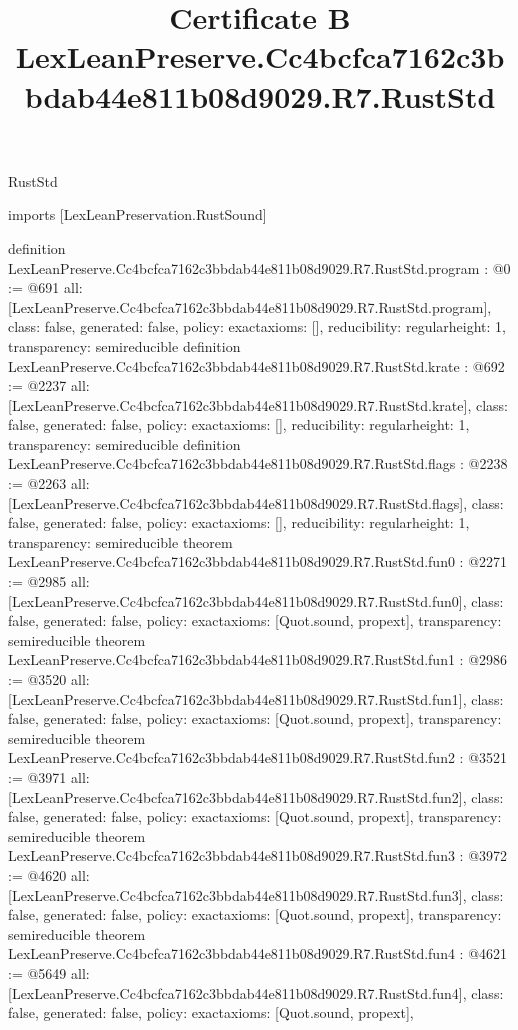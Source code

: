 \begin{lexlean}{RustStd}
\title{Certificate B LexLeanPreserve.Cc4bcfca7162c3bbdab44e811b08d9029.R7.RustStd}
\begin{coremodule}
imports [LexLeanPreservation.RustSound]

definition LexLeanPreserve.Cc4bcfca7162c3bbdab44e811b08d9029.R7.RustStd.program : @0 := @691 {
  all: [LexLeanPreserve.Cc4bcfca7162c3bbdab44e811b08d9029.R7.RustStd.program],
  class: false,
  generated: false,
  policy: exact{axioms: []},
  reducibility: regular{height: 1},
  transparency: semireducible
}
definition LexLeanPreserve.Cc4bcfca7162c3bbdab44e811b08d9029.R7.RustStd.krate : @692 := @2237 {
  all: [LexLeanPreserve.Cc4bcfca7162c3bbdab44e811b08d9029.R7.RustStd.krate],
  class: false,
  generated: false,
  policy: exact{axioms: []},
  reducibility: regular{height: 1},
  transparency: semireducible
}
definition LexLeanPreserve.Cc4bcfca7162c3bbdab44e811b08d9029.R7.RustStd.flags : @2238 := @2263 {
  all: [LexLeanPreserve.Cc4bcfca7162c3bbdab44e811b08d9029.R7.RustStd.flags],
  class: false,
  generated: false,
  policy: exact{axioms: []},
  reducibility: regular{height: 1},
  transparency: semireducible
}
theorem LexLeanPreserve.Cc4bcfca7162c3bbdab44e811b08d9029.R7.RustStd.fun0 : @2271 := @2985 {
  all: [LexLeanPreserve.Cc4bcfca7162c3bbdab44e811b08d9029.R7.RustStd.fun0],
  class: false,
  generated: false,
  policy: exact{axioms: [Quot.sound, propext]},
  transparency: semireducible
}
theorem LexLeanPreserve.Cc4bcfca7162c3bbdab44e811b08d9029.R7.RustStd.fun1 : @2986 := @3520 {
  all: [LexLeanPreserve.Cc4bcfca7162c3bbdab44e811b08d9029.R7.RustStd.fun1],
  class: false,
  generated: false,
  policy: exact{axioms: [Quot.sound, propext]},
  transparency: semireducible
}
theorem LexLeanPreserve.Cc4bcfca7162c3bbdab44e811b08d9029.R7.RustStd.fun2 : @3521 := @3971 {
  all: [LexLeanPreserve.Cc4bcfca7162c3bbdab44e811b08d9029.R7.RustStd.fun2],
  class: false,
  generated: false,
  policy: exact{axioms: [Quot.sound, propext]},
  transparency: semireducible
}
theorem LexLeanPreserve.Cc4bcfca7162c3bbdab44e811b08d9029.R7.RustStd.fun3 : @3972 := @4620 {
  all: [LexLeanPreserve.Cc4bcfca7162c3bbdab44e811b08d9029.R7.RustStd.fun3],
  class: false,
  generated: false,
  policy: exact{axioms: [Quot.sound, propext]},
  transparency: semireducible
}
theorem LexLeanPreserve.Cc4bcfca7162c3bbdab44e811b08d9029.R7.RustStd.fun4 : @4621 := @5649 {
  all: [LexLeanPreserve.Cc4bcfca7162c3bbdab44e811b08d9029.R7.RustStd.fun4],
  class: false,
  generated: false,
  policy: exact{axioms: [Quot.sound, propext]},
}
\end{coremodule}
\end{lexlean}
